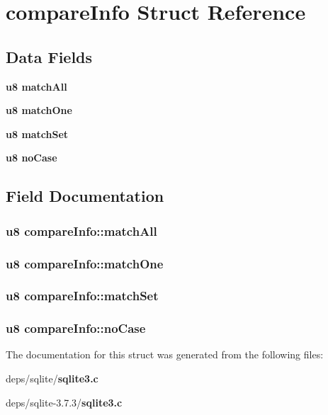 \section{compare\-Info Struct Reference}
\label{structcompareInfo}
\subsection*{Data Fields}
\begin{CompactItemize}
\item 
\bf{u8} \bf{match\-All}
\item 
\bf{u8} \bf{match\-One}
\item 
\bf{u8} \bf{match\-Set}
\item 
\bf{u8} \bf{no\-Case}
\end{CompactItemize}


\subsection{Field Documentation}
\subsubsection{\setlength{\rightskip}{0pt plus 5cm}\bf{u8} \bf{compare\-Info::match\-All}}\label{structcompareInfo_ec7df42e0ed7f2427fc7e98d3764e1d7}


\subsubsection{\setlength{\rightskip}{0pt plus 5cm}\bf{u8} \bf{compare\-Info::match\-One}}\label{structcompareInfo_d9acad1caa8200d6da4f12100c0a9a77}


\subsubsection{\setlength{\rightskip}{0pt plus 5cm}\bf{u8} \bf{compare\-Info::match\-Set}}\label{structcompareInfo_9d36f0fd3693d3828783df6d5e60d946}


\subsubsection{\setlength{\rightskip}{0pt plus 5cm}\bf{u8} \bf{compare\-Info::no\-Case}}\label{structcompareInfo_8aac06fa3c4125045be939d5f89cb350}




The documentation for this struct was generated from the following files:\begin{CompactItemize}
\item 
deps/sqlite/\bf{sqlite3.c}\item 
deps/sqlite-3.7.3/\bf{sqlite3.c}\end{CompactItemize}
